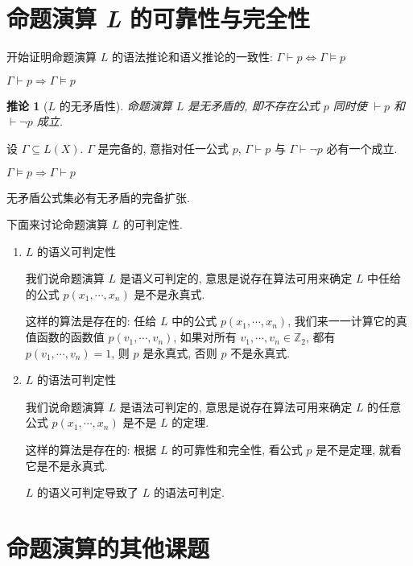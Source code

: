 \documentclass[
    mode=hazy,
    color=blue,
    device=normal,
    lang=cn
]{elegantnote}
\newtheorem{deduction}{推论}[section]
\begin{document}
\section{命题演算 \textit{L} 的可靠性与完全性}
开始证明命题演算 $L$ 的语法推论和语义推论的一致性: $\Gamma\vdash p\Leftrightarrow\Gamma\vDash p$
\begin{theorem}[$L$ 的可靠性]
    $\Gamma\vdash p\Rightarrow\Gamma\vDash p$
\end{theorem}
\begin{deduction}[$L$ 的无矛盾性]
    命题演算 $L$ 是无矛盾的, 即不存在公式 $p$ 同时使 $\vdash p$ 和 $\vdash \lnot p$ 成立.
\end{deduction}
\begin{definition}[公式集的完备性]
    设 $\Gamma\subseteq L(X)$. $\Gamma$ 是完备的, 意指对任一公式 $p$, $\Gamma\vdash p$ 与 $\Gamma\vdash\lnot p$ 必有一个成立.
\end{definition}
\begin{theorem}[$L$ 的完全性]
    $\Gamma\vDash p\Rightarrow \Gamma\vdash p$
\end{theorem}
\begin{proposition}
    无矛盾公式集必有无矛盾的完备扩张.
\end{proposition}
下面来讨论命题演算 $L$ 的可判定性.

\begin{enumerate}[label = $\arabic*^\circ$, listparindent = 2em, topsep = -1em]
    \item $L$ 的语义可判定性

          我们说命题演算 $L$ 是语义可判定的, 意思是说存在算法可用来确定 $L$ 中任给的公式 $p(x_1,\cdots,x_n)$ 是不是永真式.

          这样的算法是存在的: 任给 $L$ 中的公式 $p(x_1,\cdots,x_n)$, 我们来一一计算它的真值函数的函数值 $p(v_1, \cdots, v_n)$, 如果对所有 $v_1, \cdots,v_n\in\mathbb{Z}_2$, 都有 $p(v_1, \cdots, v_n) = 1$, 则 $p$ 是永真式, 否则 $p$ 不是永真式.
    \item $L$ 的语法可判定性

          我们说命题演算 $L$ 是语法可判定的, 意思是说存在算法可用来确定 $L$ 的任意公式 $p(x_1,\cdots,x_n)$ 是不是 $L$ 的定理.

          这样的算法是存在的: 根据 $L$ 的可靠性和完全性, 看公式 $p$ 是不是定理, 就看它是不是永真式.

          $L$ 的语义可判定导致了 $L$ 的语法可判定.
\end{enumerate}
\section{命题演算的其他课题}
\end{document}
